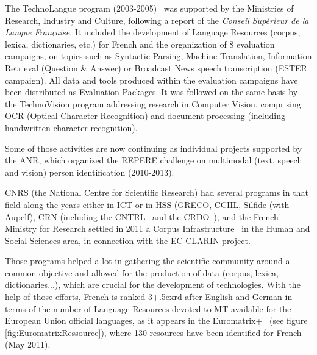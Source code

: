 \begin{multicols}{2}
The TechnoLangue program (2003-2005)~\cite{technolangue} was
supported by the Ministries of Research, Industry and Culture,
following a report of the {\em Conseil Supérieur de la Langue
  Française}. It included the development of Language Resources
(corpus, lexica, dictionaries, etc.) for French and the organization
of 8 evaluation campaigns, on topics such as Syntactic Parsing,
Machine Translation, Information Retrieval (Question \& Answer) or
Broadcast News speech transcription (ESTER campaign). All data and
tools produced within the evaluation campaigns have been distributed
as Evaluation Packages. It was followed on the same basis by the
TechnoVision program addressing research in Computer Vision,
comprising OCR (Optical Character Recognition) and document processing
(including handwritten character recognition). 

Some of those activities are now
continuing as individual projects supported by the ANR, which
organized the REPERE challenge on multimodal (text, speech and vision)
person identification (2010-2013).

CNRS (the National Centre for Scientific Research) had several
programs in that field along the years either in ICT or in HSS (GRECO,
CCIIL, Silfide (with Aupelf), CRN (including the CNTRL~\cite{cnrtl} and the
CRDO~\cite{crdo, crdo2}), and the French Ministry for Research settled in 2011 a
Corpus Infrastructure~\cite{infracorpus} in the Human and Social Sciences area, in
connection with the EC CLARIN project.

Those programs helped a lot in gathering the scientific community
around a common objective and allowed for the production of data
(corpus, lexica, dictionaries...), which are crucial for the development
of technologies. With the help of those efforts, French is ranked 3\raise+.5ex\hbox{rd}
after English and German in terms of the number of Language Resources
devoted to MT available for the European Union official languages, as
it appears in the Euromatrix+~\cite{euromatrixplus} (see figure \ref{fig:EuromatrixRessource}), where 130 resources have been identified for French (May 2011).



\end{multicols}
